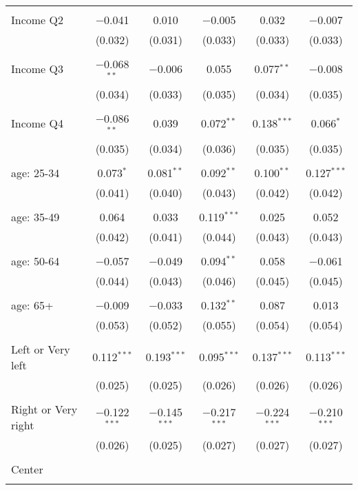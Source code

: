 \begin{tabular}{@{\extracolsep{5pt}}lccccc}
  & & & & & \\ 
 Income Q2 & $-$0.041 & 0.010 & $-$0.005 & 0.032 & $-$0.007 \\ 
  & (0.032) & (0.031) & (0.033) & (0.033) & (0.033) \\ 
  & & & & & \\ 
 Income Q3 & $-$0.068$^{**}$ & $-$0.006 & 0.055 & 0.077$^{**}$ & $-$0.008 \\ 
  & (0.034) & (0.033) & (0.035) & (0.034) & (0.035) \\ 
  & & & & & \\ 
 Income Q4 & $-$0.086$^{**}$ & 0.039 & 0.072$^{**}$ & 0.138$^{***}$ & 0.066$^{*}$ \\ 
  & (0.035) & (0.034) & (0.036) & (0.035) & (0.035) \\ 
  & & & & & \\ 
 age: 25-34 & 0.073$^{*}$ & 0.081$^{**}$ & 0.092$^{**}$ & 0.100$^{**}$ & 0.127$^{***}$ \\ 
  & (0.041) & (0.040) & (0.043) & (0.042) & (0.042) \\ 
  & & & & & \\ 
 age: 35-49 & 0.064 & 0.033 & 0.119$^{***}$ & 0.025 & 0.052 \\ 
  & (0.042) & (0.041) & (0.044) & (0.043) & (0.043) \\ 
  & & & & & \\ 
 age: 50-64 & $-$0.057 & $-$0.049 & 0.094$^{**}$ & 0.058 & $-$0.061 \\ 
  & (0.044) & (0.043) & (0.046) & (0.045) & (0.045) \\ 
  & & & & & \\ 
 age: 65+ & $-$0.009 & $-$0.033 & 0.132$^{**}$ & 0.087 & 0.013 \\ 
  & (0.053) & (0.052) & (0.055) & (0.054) & (0.054) \\ 
  & & & & & \\ 
 Left or Very left & 0.112$^{***}$ & 0.193$^{***}$ & 0.095$^{***}$ & 0.137$^{***}$ & 0.113$^{***}$ \\ 
  & (0.025) & (0.025) & (0.026) & (0.026) & (0.026) \\ 
  & & & & & \\ 
 Right or Very right & $-$0.122$^{***}$ & $-$0.145$^{***}$ & $-$0.217$^{***}$ & $-$0.224$^{***}$ & $-$0.210$^{***}$ \\ 
  & (0.026) & (0.025) & (0.027) & (0.027) & (0.027) \\ 
  & & & & & \\ 
 Center &  &  &  &  &  \\ 
  &  &  &  &  &  \\ 

\end{tabular}
